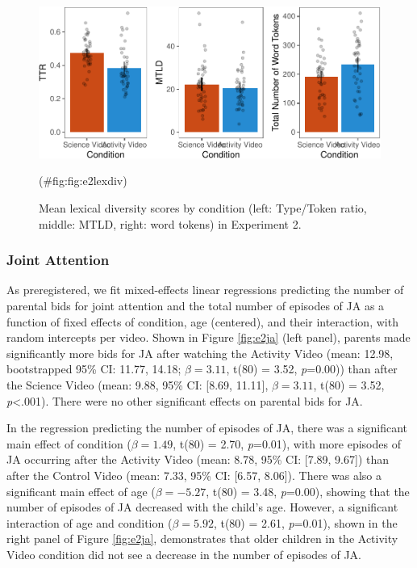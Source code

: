 \documentclass[man,floatsintext]{apa6}
\begin{document}
\begin{figure}[H]

{\centering \includegraphics{figs/fig:e2lexdiv-1} 

}

\caption{\label{fig:e2lexdiv} Mean lexical diversity scores by condition (left: Type/Token ratio, middle: MTLD, right: word tokens) in Experiment 2.}(\#fig:fig:e2lexdiv)
\end{figure}

\hypertarget{joint-attention-1}{%
\subsubsection{Joint Attention}\label{joint-attention-1}}

As preregistered, we fit mixed-effects linear regressions predicting the number of parental bids for joint attention and the total number of episodes of JA as a function of fixed effects of condition, age (centered), and their interaction, with random intercepts per video.
Shown in Figure \ref{fig:e2ja} (left panel), parents made significantly more bids for JA after watching the Activity Video (mean: 12.98, bootstrapped 95\% CI: 11.77, 14.18; \(\beta=3.11\), t(80) = 3.52, \emph{p}=0.00)) than after the Science Video (mean: 9.88, 95\% CI: {[}8.69, 11.11{]}, \(\beta=3.11\), t(80) = 3.52, \emph{p}\textless{}.001).
There were no other significant effects on parental bids for JA.

In the regression predicting the number of episodes of JA, there was a significant main effect of condition (\(\beta=1.49\), t(80) = 2.70, \emph{p}=0.01), with more episodes of JA occurring after the Activity Video (mean: 8.78, 95\% CI: {[}7.89, 9.67{]}) than after the Control Video (mean: 7.33, 95\% CI: {[}6.57, 8.06{]}).
There was also a significant main effect of age (\(\beta=-5.27\), t(80) = 3.48, \emph{p}=0.00), showing that the number of episodes of JA decreased with the child's age.
However, a significant interaction of age and condition (\(\beta=5.92\), t(80) = 2.61, \emph{p}=0.01), shown in the right panel of Figure \ref{fig:e2ja}, demonstrates that older children in the Activity Video condition did not see a decrease in the number of episodes of JA.
\end{document}
